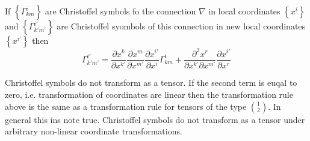 \documentclass[a4paper,10pt]{article}
\newenvironment{remark}[1][Remark]{\begin{trivlist}
\item[\hskip \labelsep {\bfseries #1}]}{\end{trivlist}}
\begin{document}
If $\left\lbrace \Gamma_{km}^{i}\right\rbrace$
 are Christoffel symbols fo the connection $\nabla$ in local coordinates $\left\lbrace x^i\right\rbrace$
and $\left\lbrace \Gamma_{k'm'}^{i'}\right\rbrace$ are Christoffel syombols of this connection in new local coordinates
$\left\lbrace x^{i'}\right\rbrace$ then
\begin{equation}\label{2.11}
 \Gamma_{k'm'}^{i'} = \dfrac{\partial x^{k}}{\partial x^{k'}}\dfrac{\partial x^{m}}{\partial x^{m'}}
 \dfrac{\partial x^{i'}}{\partial x^{i}}\Gamma_{km}^{i}
 + \dfrac{\partial^{2} x^{r}}{\partial x^{k'}\partial x^{m'}} \dfrac{\partial x^{i'}}{\partial x^{r}}
\end{equation}
\begin{remark}
 Christoffel symbols do not transform as a tensor. If the second term is euqal to zero, i.e. transformation 
 of coordinates are linear then the transformation rule above is the same as a transformation rule for tensors
 of the type  $\binom{1}{2}$. In general this ins note true. Christoffel symbols do not transform as a tensor under
 arbitrary non-linear coordinate transformations.
\end{remark}
\end{document}
